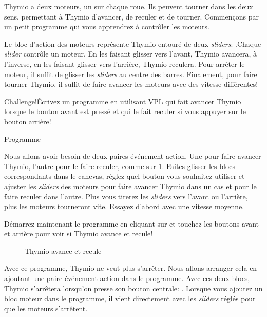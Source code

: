 \label{Chap.Thymio.bouge}


Thymio a deux moteurs, un sur chaque roue. Ils peuvent tourner dans les deux sens, permettant à Thymio d'avancer, de reculer et de tourner. Commençons par un petit programme qui vous apprendrez à contrôler les moteurs.

Le bloc d'action des moteurs représente Thymio entouré de deux \textit{sliders}: .Chaque \textit{slider} contrôle un moteur. En les faisant glisser vers l'avant, Thymio avancera, à l'inverse, en les faisant glisser vers l'arrière, Thymio reculera. Pour arrêter le moteur, il suffit de glisser les \textit{sliders} au centre des barres. Finalement, pour faire tourner Thymio, il suffit de faire avancer les moteurs avec des vitesse différentes!

\begin{bclogo}[couleur = pink!30, arrondi = 0.1, logo = \bccrayon, ombre = true]{Challenge!}Écrivez un programme en utilisant VPL qui fait avancer Thymio lorsque le bouton avant est pressé et qui le fait reculer si vous appuyer sur le bouton arrière!
\end{bclogo}

{\raggedleft \hfill Programme }

Nous allons avoir besoin de deux paires événement-action. Une pour faire avancer Thymio, l'autre pour le faire reculer, comme sur \cref{fig.nostop}. Faites glisser les blocs correspondants dans le canevas, réglez quel bouton vous souhaitez utiliser et ajuster les \textit{sliders} des moteurs pour faire avancer Thymio dans un cas et pour le faire reculer dans l'autre. Plus vous tirerez les \textit{sliders} vers l'avant ou l'arrière, plus les moteurs tourneront vite. Essayez d'abord avec une vitesse moyenne.

Démarrez maintenant le programme en cliquant sur  et touchez les boutons avant et arrière pour voir si Thymio avance et recule!

\begin{figure}
\begin{center}
\caption{Thymio avance et recule}\label{fig.nostop}
\end{center}
\end{figure}


Avec ce programme, Thymio ne veut plus s'arrêter. Nous allons arranger cela en ajoutant une paire événement-action dans le programme. Avec ces deux blocs, Thymio s'arrêtera lorsqu'on presse son bouton centrale: . Lorsque vous ajoutez un bloc moteur dans le programme, il vient directement avec les \textit{sliders} réglés pour que les moteurs s'arrêtent.

